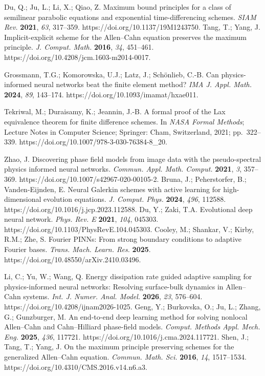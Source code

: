  Du, Q.; Ju, L.; Li, X.; Qiao, Z. Maximum bound principles for a class of semilinear parabolic equations and exponential time-differencing schemes. \textit{SIAM Rev.} \textbf{2021}, \textit{63}, 317--359. https://doi.org/10.1137/19M1243750.
 Tang, T.; Yang, J. Implicit-explicit scheme for the Allen--Cahn equation preserves the maximum principle. \textit{J. Comput. Math.} \textbf{2016}, \textit{34}, 451--461. https://doi.org/10.4208/jcm.1603-m2014-0017.

 Grossmann, T.G.; Komorowska, U.J.; Latz, J.; Sch\"onlieb, C.-B. Can physics-informed neural networks beat the finite element method? \textit{IMA J. Appl. Math.} \textbf{2024}, \textit{89}, 143--174. https://doi.org/10.1093/imamat/hxae011.

 Tekriwal, M.; Duraisamy, K.; Jeannin, J.-B. A formal proof of the Lax equivalence theorem for finite difference schemes. In \textit{NASA Formal Methods}; Lecture Notes in Computer Science; Springer: Cham, Switzerland, 2021; pp.\ 322--339. https://doi.org/10.1007/978-3-030-76384-8\_20.

 Zhao, J. Discovering phase field models from image data with the pseudo-spectral physics informed neural networks. \textit{Commun. Appl. Math. Comput.} \textbf{2021}, \textit{3}, 357--369. https://doi.org/10.1007/s42967-020-00105-2.
 Bruna, J.; Peherstorfer, B.; Vanden-Eijnden, E. Neural Galerkin schemes with active learning for high-dimensional evolution equations. \textit{J. Comput. Phys.} \textbf{2024}, \textit{496}, 112588. https://doi.org/10.1016/j.jcp.2023.112588.
 Du, Y.; Zaki, T.A. Evolutional deep neural network. \textit{Phys. Rev. E} \textbf{2021}, \textit{104}, 045303. https://doi.org/10.1103/PhysRevE.104.045303.
 Cooley, M.; Shankar, V.; Kirby, R.M.; Zhe, S. Fourier PINNs: From strong boundary conditions to adaptive Fourier bases. \textit{Trans. Mach. Learn. Res.} \textbf{2025}. https://doi.org/10.48550/arXiv.2410.03496.

 Li, C.; Yu, W.; Wang, Q. Energy dissipation rate guided adaptive sampling for physics-informed neural networks: Resolving surface-bulk dynamics in Allen--Cahn systems. \textit{Int. J. Numer. Anal. Model.} \textbf{2026}, \textit{23}, 576--604. https://doi.org/10.4208/ijnam2026-1025.
 Geng, Y.; Burkovska, O.; Ju, L.; Zhang, G.; Gunzburger, M. An end-to-end deep learning method for solving nonlocal Allen--Cahn and Cahn--Hilliard phase-field models. \textit{Comput. Methods Appl. Mech. Eng.} \textbf{2025}, \textit{436}, 117721. https://doi.org/10.1016/j.cma.2024.117721.
 Shen, J.; Tang, T.; Yang, J. On the maximum principle preserving schemes for the generalized Allen--Cahn equation. \textit{Commun. Math. Sci.} \textbf{2016}, \textit{14}, 1517--1534. https://doi.org/10.4310/CMS.2016.v14.n6.a3.

